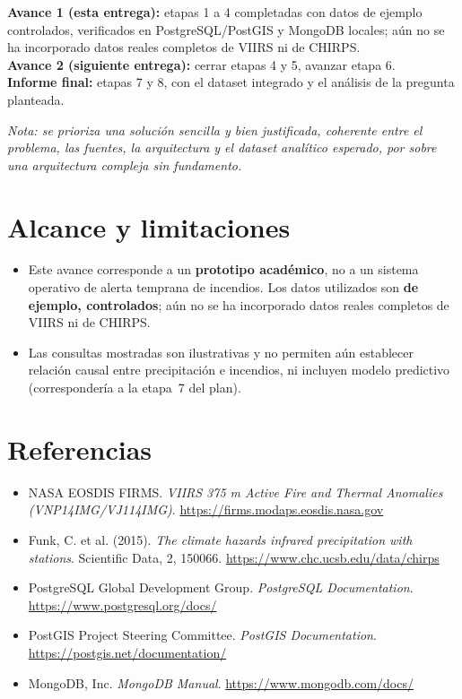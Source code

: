 \documentclass[11pt,a4paper]{article}
\begin{document}
\noindent\textbf{Avance 1 (esta entrega):} etapas 1 a 4 completadas con datos de ejemplo controlados, verificados en PostgreSQL/PostGIS y MongoDB locales; a\'un no se ha incorporado datos reales completos de VIIRS ni de CHIRPS.\\
\textbf{Avance 2 (siguiente entrega):} cerrar etapas 4 y 5, avanzar etapa 6.\\
\textbf{Informe final:} etapas 7 y 8, con el dataset integrado y el an\'alisis de la pregunta planteada.

\vspace{0.3cm}
\noindent\textit{Nota: se prioriza una soluci\'on sencilla y bien justificada, coherente entre el problema, las fuentes, la arquitectura y el dataset anal\'itico esperado, por sobre una arquitectura compleja sin fundamento.}

\section{Alcance y limitaciones}
\label{sec:alcance}

\begin{itemize}
    \item Este avance corresponde a un \textbf{prototipo acad\'emico}, no a un sistema operativo de alerta temprana de incendios. Los datos utilizados son \textbf{de ejemplo, controlados}; a\'un no se ha incorporado datos reales completos de VIIRS ni de CHIRPS.
    \item Las consultas mostradas son ilustrativas y no permiten a\'un establecer relaci\'on causal entre precipitaci\'on e incendios, ni incluyen modelo predictivo (correspondería a la etapa~7 del plan).
\end{itemize}

\section{Referencias}

\footnotesize
\begin{itemize}
    \item NASA EOSDIS FIRMS. \textit{VIIRS 375 m Active Fire and Thermal Anomalies (VNP14IMG/VJ114IMG)}. \url{https://firms.modaps.eosdis.nasa.gov}
    \item Funk, C. et al. (2015). \textit{The climate hazards infrared precipitation with stations}. Scientific Data, 2, 150066. \url{https://www.chc.ucsb.edu/data/chirps}
    \item PostgreSQL Global Development Group. \textit{PostgreSQL Documentation}. \url{https://www.postgresql.org/docs/}
    \item PostGIS Project Steering Committee. \textit{PostGIS Documentation}. \url{https://postgis.net/documentation/}
    \item MongoDB, Inc. \textit{MongoDB Manual}. \url{https://www.mongodb.com/docs/}
\end{itemize}
\normalsize
\end{document}
